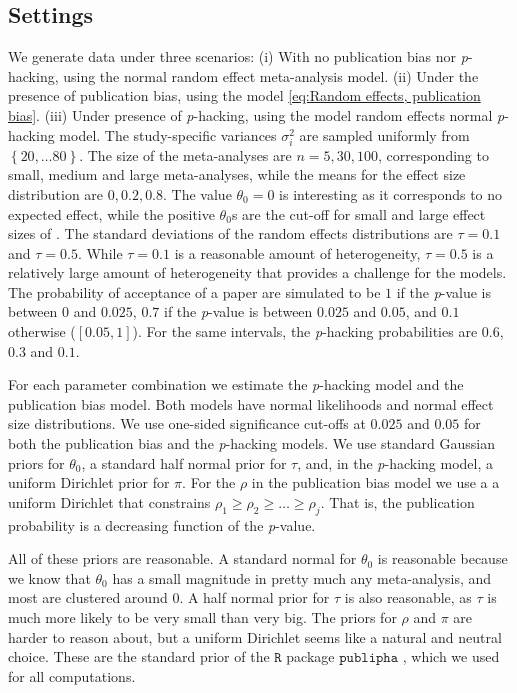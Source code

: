\documentclass{article}
\theoremstyle{plain}
\theoremstyle{definition}
\begin{document}
\subsection{Settings}
We generate data under three scenarios: (i) With no publication bias nor \textit{p}-hacking, using the normal random effect meta-analysis model. (ii) Under the presence of publication bias, using the model \eqref{eq:Random effects, publication bias}. (iii) Under presence of \textit{p}-hacking, using the model random effects normal \textit{p}-hacking model. The study-specific variances $\sigma_{i}^{2}$ are sampled uniformly from $\left\{ 20,\ldots80\right\} $. The size of the meta-analyses are $n = 5, 30, 100$, corresponding to small, medium and large meta-analyses, while the means for the effect size distribution are $0, 0.2, 0.8$. The value $\theta_0 = 0$ is interesting as it corresponds to no expected effect, while the positive $\theta_0$s are the cut-off for small and large effect sizes of \citet[][pages 24 -- 27]{cohen1988statistical}. The standard deviations of the random effects distributions are $\tau=0.1$ and $\tau=0.5$. While $\tau = 0.1$ is a reasonable amount of heterogeneity, $\tau=0.5$ is a relatively large amount of heterogeneity that provides a challenge for the models. The probability of acceptance of a paper are simulated to be $1$ if the \textit{p}-value is between $0$ and $0.025$, $0.7$ if the \textit{p}-value is between $0.025$ and $0.05$, and $0.1$ otherwise ($[0.05, 1]$). For the same intervals, the \textit{p}-hacking probabilities are $0.6$, $0.3$ and $0.1$.

For each parameter combination we estimate the \textit{p}-hacking model and the publication bias model. Both models have normal likelihoods and normal effect size distributions. We use one-sided significance cut-offs at $0.025$ and $0.05$ for both the publication bias and the \textit{p}-hacking models. We use standard Gaussian priors for $\theta_0$, a standard half normal prior for $\tau$, and, in the \textit{p}-hacking model, a uniform Dirichlet prior for $\pi$. For the $\rho$ in the publication bias model we use a a uniform Dirichlet that constrains $\rho_{1}\geq\rho_{2}\geq\ldots\geq\rho_{j}$. That is, the publication probability is a decreasing function of the \textit{p}-value.

All of these priors are reasonable. A standard normal for $\theta_0$ is reasonable because we know that $\theta_0$ has a small magnitude in pretty much any meta-analysis, and most are clustered around $0$. A half normal prior for $\tau$ is also reasonable, as $\tau$ is much more likely to be very small than very big. The priors for $\rho$ and $\pi$ are harder to reason about, but a uniform Dirichlet seems like a natural and neutral choice. These are the standard prior of the $\mathtt{R}$ package $\mathtt{publipha}$ \citep{publipha}, which we used for all computations.
\end{document}
